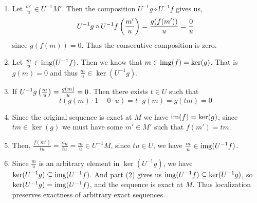 \documentclass[Notebook.tex]{subfiles}
\begin{document}
\begin{solution}
    \bbni
    \begin{enumerate}
        \item Let $\frac{m'}{u} \in U^{-1}M'$. Then the composition $U^{-1}g \circ U^{-1}f$ gives us, 
        \[U^{-1}g \circ U^{-1}f \left(\frac{m'}{u}\right) = \frac{g(f(m'))}{u} = \frac{0}{u}\]
        since $g(f(m)) = 0$. Thus the consecutive composition is zero. 

        \item Let $\frac{m}{u} \in \operatorname{img}(U^{-1}f)$. Then we know that $m \in \operatorname{img}(f) = \ker(g)$. That is $g(m) = 0$ and thus $\frac{m}{u} \in \ker(U^{-1}g)$. 
        
        \item If $U^{-1}g \left(\frac{m}{u}\right) = \frac{g(m)}{u} = 0$. Then there exists $t \in U$ such that 
        \[t(g(m) \cdot 1 - 0 \cdot u) = t \cdot g(m) = g (tm) = 0\]

        \item Since the original sequence is exact at $M$ we have $\operatorname{im}(f) = \ker(g)$, since $tm \in \ker(g)$ we must have some $m' \in M'$ such that $f(m') =tm$.  
        
        \item Then, $\frac{f(m')}{tu} = \frac{tm}{tu} = \frac{m}{u} \in U^{-1}M$, since $tu \in U$, we have $\frac{m}{u} \in \operatorname{img}(U^{-1}f)$.
        
        \item Since $\frac{m}{u}$ is an arbitrary element in $\ker(U^{-1}g)$, we have $\ker(U^{-1}g) \subseteq \operatorname{img}(U^{-1}f)$. And part (2) gives us $\operatorname{img}(U^{-1}f) \subseteq \ker(U^{-1}g)$, so $\ker(U^{-1}g) = \operatorname{img}(U^{-1}f)$, and the sequence is exact at $M$. Thus localization preserves exactness of arbitrary exact sequences. 
    \end{enumerate}
\end{solution}

\newpage 
\end{document}
